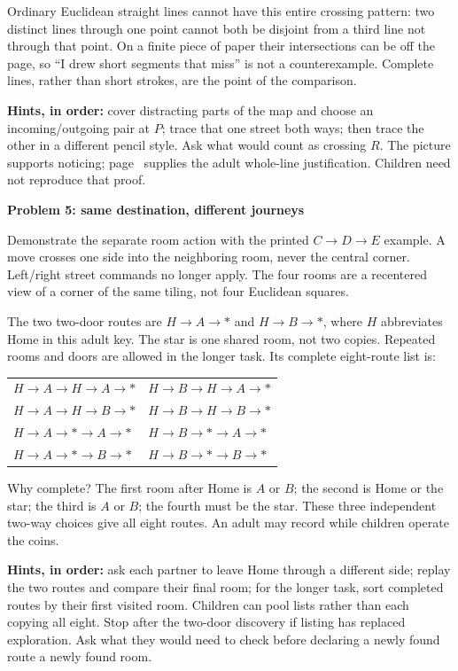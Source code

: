 \documentclass[11pt]{article}
\newcommand{\sub}[1]{{\bfseries #1}\par}
\begin{document}
Ordinary Euclidean straight lines cannot have this entire crossing pattern: two distinct lines through one point cannot both be disjoint from a third line not through that point. On a finite piece of paper their intersections can be off the page, so ``I drew short segments that miss'' is not a counterexample. Complete lines, rather than short strokes, are the point of the comparison.

\textbf{Hints, in order:} cover distracting parts of the map and choose an incoming/outgoing pair at \(P\); trace that one street both ways; then trace the other in a different pencil style. Ask what would count as crossing \(R\). The picture supports noticing; page~\pageref{complete-proof} supplies the adult whole-line justification. Children need not reproduce that proof.

\sub{Problem 5: same destination, different journeys}
Demonstrate the separate room action with the printed \(C\to D\to E\) example. A move crosses one side into the neighboring room, never the central corner. Left/right street commands no longer apply. The four rooms are a recentered view of a corner of the same tiling, not four Euclidean squares.

The two two-door routes are \(H\to A\to *\) and \(H\to B\to *\), where \(H\) abbreviates Home in this adult key. The star is one shared room, not two copies. Repeated rooms and doors are allowed in the longer task. Its complete eight-route list is:
\begin{center}
\begin{tabular}{ll}
\(H\to A\to H\to A\to *\) & \(H\to B\to H\to A\to *\) \\
\(H\to A\to H\to B\to *\) & \(H\to B\to H\to B\to *\) \\
\(H\to A\to *\to A\to *\) & \(H\to B\to *\to A\to *\) \\
\(H\to A\to *\to B\to *\) & \(H\to B\to *\to B\to *\)
\end{tabular}
\end{center}
Why complete? The first room after Home is \(A\) or \(B\); the second is Home or the star; the third is \(A\) or \(B\); the fourth must be the star. These three independent two-way choices give all eight routes. An adult may record while children operate the coins.

\textbf{Hints, in order:} ask each partner to leave Home through a different side; replay the two routes and compare their final room; for the longer task, sort completed routes by their first visited room. Children can pool lists rather than each copying all eight. Stop after the two-door discovery if listing has replaced exploration. Ask what they would need to check before declaring a newly found route a newly found room.
\end{document}
